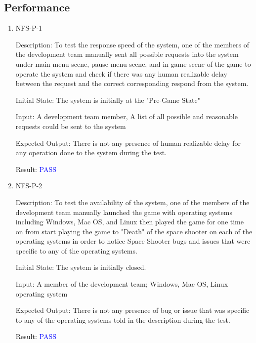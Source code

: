 \documentclass[12pt, titlepage]{article}
\begin{document}
\subsection{Performance}

\begin{enumerate}

\item{NFS-P-1\\}

Description: To test the response speed of the system, one of the members of the development team manually sent all possible requests into the system under main-menu scene, pause-menu scene, and in-game scene of the game to operate the system and check if there was any human realizable delay between the request and the correct corresponding respond from the system.

Initial State: The system is initially at the "Pre-Game State"
					
Input: A development team member, A list of all possible and reasonable requests could be sent to the system 

Expected Output: There is not any presence of human realizable delay for any operation done to the system during the test.

Result: \textcolor{blue}{PASS}

\item{NFS-P-2\\}

Description: To test the availability of the system, one of the members of the development team manually launched the game with operating systems including Windows, Mac OS, and Linux then played the game for one time on  from start playing the game to "Death" of the space shooter on each of the operating systems in order to notice Space Shooter bugs and issues that were specific to any of the operating systems.

Initial State: The system is initially closed.
					
Input: A member of the development team; Windows, Mac OS, Linux operating system

Expected Output: There is not any presence of bug or issue that was specific to any of the operating systems told in the description during the test.

Result: \textcolor{blue}{PASS}
\end{enumerate}
\end{document}
